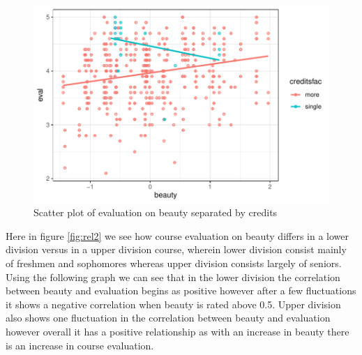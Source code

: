 \documentclass[
  12 pt,
]{article}
\begin{document}
\begin{figure}[H]

{\centering \includegraphics{18205420_Markdown--1-_files/figure-latex/rel1-1} 

}

\caption{Scatter plot of evaluation on beauty separated by credits}\label{fig:rel1}
\end{figure}

\newpage

Here in figure \ref{fig:rel2} we see how course evaluation on beauty differs in a lower division versus in a upper division course, wherein lower division consist mainly of freshmen and sophomores whereas upper division consists largely of seniors. Using the following graph we can see that in the lower division the correlation between beauty and evaluation begins as positive however after a few fluctuations it shows a negative correlation when beauty is rated above 0.5.
Upper division also shows one fluctuation in the correlation between beauty and evaluation however overall it has a positive relationship as with an increase in beauty there is an increase in course evaluation.
\end{document}
